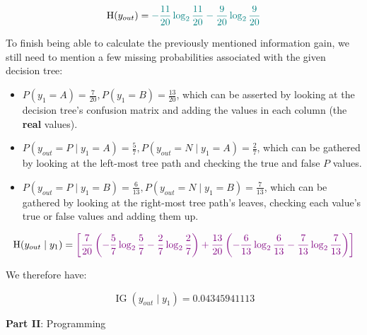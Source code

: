 \documentclass[12pt]{article}
\begin{document}
\begin{enumerate}[leftmargin=\labelsep]
        \begin{equation}
          \operatorname{H}(y_{out}) = \textcolor{teal}{- \frac{11}{20} \log_2 \frac{11}{20} - \frac{9}{20} \log_2 \frac{9}{20}}
        \end{equation}

        To finish being able to calculate the previously mentioned information gain, we still
        need to mention a few missing probabilities associated with the given decision tree:

        \begin{itemize}
          \item $P(y_1 = A) = \frac{7}{20}, P(y_1 = B) = \frac{13}{20}$,
                which can be asserted by looking at the decision tree's confusion matrix
                and adding the values in each column (the \textbf{real} values).
          \item $P(y_{out} = P \mid y_1 = A) = \frac{5}{7}, P(y_{out} = N \mid y_1 = A) = \frac{2}{7}$,
                which can be gathered by looking at the left-most tree path and checking the true
                and false $P$ values.
          \item $P(y_{out} = P \mid y_1 = B) = \frac{6}{13}, P(y_{out} = N \mid y_1 = B) = \frac{7}{13}$,
                which can be gathered by looking at the right-most tree path's leaves,
                checking each value's true or false values and adding them up.
        \end{itemize}

        \begin{equation}
          \operatorname{H}(y_{out} \mid y_1) = \textcolor{violet}{\left[\frac{7}{20}\left(- {\frac{5}{7}} \log_2 \frac{5}{7} - \frac{2}{7} \log_2 \frac{2}{7}\right) + \frac{13}{20}\left(- \frac{6}{13} \log_2 \frac{6}{13} - \frac{7}{13} \log_2 \frac{7}{13}\right)\right]}
        \end{equation}

        We therefore have:

        $$
          \operatorname{IG}(y_{out} \mid y_1) = 0.04345941113
        $$

\end{enumerate}

\pagebreak

\center\large{\textbf{Part II}: Programming}
\end{document}
